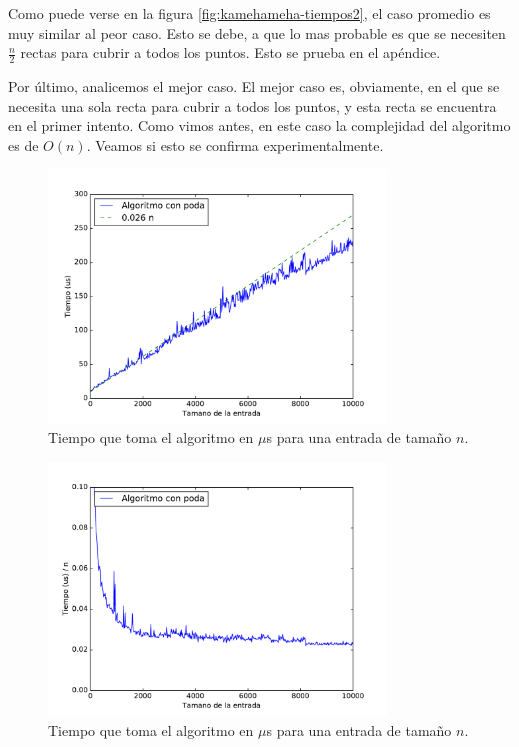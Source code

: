 Como puede verse en la figura \ref{fig:kamehameha-tiempos2}, el caso promedio es muy similar al peor caso. Esto se debe, a que lo mas probable es que se necesiten $\frac{n}{2}$ rectas para cubrir a todos los puntos. Esto se prueba en el ap\'endice.

Por último, analicemos el mejor caso. El mejor caso es, obviamente, en el que se necesita una sola recta para cubrir a todos los puntos, y esta recta se encuentra en el primer intento. Como vimos antes, en este caso la complejidad del algoritmo es de $O(n)$. Veamos si esto se confirma experimentalmente.

\begin{figure}[H]
 \centering
	\includegraphics[width=0.8\textwidth]{img/tiempos/kamehameha3.pdf}
	\caption{\footnotesize Tiempo que toma el algoritmo en $\mu$s para una entrada de tamaño $n$.}
	\label{fig:kamehameha-tiempos3}
\end{figure}

\begin{figure}[H]
 \centering
	\includegraphics[width=0.8\textwidth]{img/tiempos/kamehameha4.pdf}
	\caption{\footnotesize Tiempo que toma el algoritmo en $\mu$s para una entrada de tamaño $n$.}
	\label{fig:kamehameha-tiempos4}
\end{figure}

